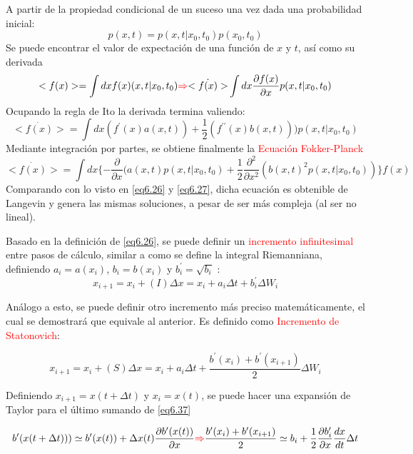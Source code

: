 \documentclass{book}
\begin{document}
A partir de la propiedad condicional de un suceso una vez dada una probabilidad inicial:
\begin{equation}\label{eq6.32}p(x,t)=p(x,t|x_0,t_0)p(x_0,t_0)\end{equation}
Se puede encontrar el valor de expectación de una función de $x$ y $t$, así como su derivada
\begin{equation}\label{eq6.33}<f(x)>=\int dx f(x)(x,t|x_0,t_0) \textcolor{red}{\Rightarrow} \dot{<f(x)>}\int dx \frac{\partial f(x)}{\partial x} p(x,t|x_0,t_0)\end{equation}
Ocupando la regla de Ito la derivada termina valiendo:
\begin{equation}\label{eq6.34}\dot{<f(x)>}=\int dx (f^\prime(x)a(x,t)) +\frac{1}{2}(f^{\prime\prime}(x)b(x,t)))p(x,t|x_0,t_0)\end{equation}
Mediante integración por partes, se obtiene finalmente la \textcolor{red}{Ecuación Fokker-Planck}
\begin{equation}\label{eq6.35}\dot{<f(x)>}=\int dx \{-\frac{\partial}{\partial x}(a(x,t)p(x,t|x_0,t_0)+\frac{1}{2}\frac{\partial^2}{\partial x^2}(b(x,t)^2p(x,t|x_0,t_0))\} f(x)\end{equation}
Comparando con lo visto en \ref{eq6.26} y \ref{eq6.27}, dicha ecuación es obtenible de Langevin y genera las mismas soluciones, a pesar de ser más compleja (al ser no lineal). 


Basado en la definición de \ref{eq6.26}, se puede definir un \textcolor{red}{incremento infinitesimal} entre pasos de cálculo, similar a como se define la integral Riemanniana, definiendo $a_i=a(x_i)$, $b_i=b(x_i)$ y $b^\prime_i=\sqrt{b_i}$
:
\begin{equation}\label{eq6.36}x_{i+1}=x_i+(I)\Delta x=x_i+a_i\Delta t+b^\prime_i\Delta W_i\end{equation}

Análogo a esto, se puede definir otro incremento más preciso matemáticamente, el cual se demostrará que equivale al anterior. Es definido como \textcolor{red}{Incremento de Statonovich}:

\begin{equation}\label{eq6.37}x_{i+1}=x_i+(S)\Delta x=x_i+a_i\Delta t+\frac{b^\prime(x_i)+b^\prime(x_{i+1})}{2}\Delta W_i \end{equation}

Definiendo $x_{i+1}=x(t+\Delta t)$ y $x_i=x(t)$, se puede hacer una expansión de Taylor para el último sumando de \ref{eq6.37}

\begin{equation}\label{eq6.38}b^\prime(x(t+\Delta t)))\simeq b^\prime(x(t))+\Delta x(t)\frac{\partial b^\prime(x(t))}{\partial x}\textcolor{red}{\Rightarrow}\frac{b^\prime(x_i)+b^\prime(x_{i+1})}{2}\simeq b_i+\frac{1}{2}\frac{\partial b^\prime_{i}}{\partial x}\frac{dx}{dt}\Delta t \end{equation}
\end{document}
